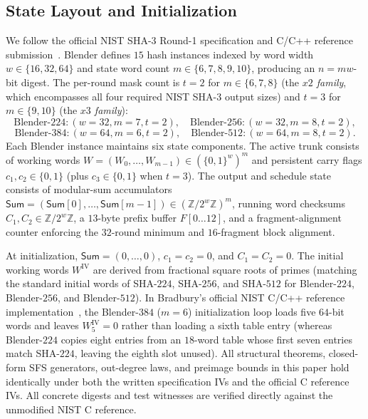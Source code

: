 \documentclass[11pt,a4paper]{article}
\theoremstyle{definition}
\theoremstyle{remark}
\newcommand{\Zmod}[1]{\mathbb{Z}/2^{#1}\mathbb{Z}}
\newcommand{\SumAcc}{\mathsf{Sum}}
\begin{document}
\subsection{State Layout and Initialization}
\label{subsec:spec-init}
We follow the official NIST SHA-3 Round-1 specification and C/C++ reference submission~\cite{Bra08}. Blender defines $15$ hash instances indexed by word width $w \in \{16, 32, 64\}$ and state word count $m \in \{6, 7, 8, 9, 10\}$, producing an $n = mw$-bit digest. The per-round mask count is $t = 2$ for $m \in \{6, 7, 8\}$ (the \emph{$x2$ family}, which encompasses all four required NIST SHA-3 output sizes) and $t = 3$ for $m \in \{9, 10\}$ (the \emph{$x3$ family}):
\[
    \text{Blender-}224: (w{=}32, m{=}7, t{=}2), \quad
    \text{Blender-}256: (w{=}32, m{=}8, t{=}2),
\]
\[
    \text{Blender-}384: (w{=}64, m{=}6, t{=}2), \quad
    \text{Blender-}512: (w{=}64, m{=}8, t{=}2).
\]
Each Blender instance maintains six state components. The active trunk consists of working words $W = (W_0, \dots, W_{m-1}) \in (\{0,1\}^w)^m$ and persistent carry flags $c_1, c_2 \in \{0,1\}$ (plus $c_3 \in \{0,1\}$ when $t = 3$). The output and schedule state consists of modular-sum accumulators $\SumAcc = (\SumAcc[0], \dots, \SumAcc[m-1]) \in (\Zmod{w})^m$, running word checksums $C_1, C_2 \in \Zmod{w}$, a $13$-byte prefix buffer $F[0 \dots 12]$, and a fragment-alignment counter enforcing the $32$-round minimum and $16$-fragment block alignment.

At initialization, $\SumAcc = (0, \dots, 0)$, $c_1 = c_2 = 0$, and $C_1 = C_2 = 0$. The initial working words $W^{\mathrm{IV}}$ are derived from fractional square roots of primes (matching the standard initial words of SHA-$224$, SHA-$256$, and SHA-$512$ for Blender-$224$, Blender-$256$, and Blender-$512$). In Bradbury's official NIST C/C++ reference implementation~\cite{Bra08}, the Blender-$384$ ($m=6$) initialization loop loads five $64$-bit words and leaves $W^{\mathrm{IV}}_5 = 0$ rather than loading a sixth table entry (whereas Blender-$224$ copies eight entries from an $18$-word table whose first seven entries match SHA-$224$, leaving the eighth slot unused). All structural theorems, closed-form SFS generators, out-degree laws, and preimage bounds in this paper hold identically under both the written specification IVs and the official C reference IVs. All concrete digests and test witnesses are verified directly against the unmodified NIST C reference.
\end{document}
